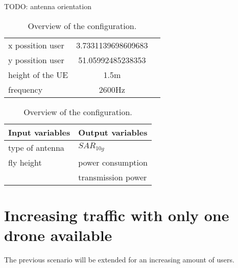 TODO: antenna orientation

\begin{table}[!htb]
    \begin{minipage}{.5\linewidth}
      \centering
        \begin{tabular}{|l|c|l|}
        \hline
        x possition user               & 3.7331139698609683        \\    
        y possition user               & 51.05992485238353           \\ 
        height of the \gls{UE}         & 1.5m                      \\ 
        frequency                      & 2600Hz                   \\ 
        \hline
        \end{tabular}
    \end{minipage}%
    \begin{minipage}{.5\linewidth}
      \centering
            \begin{tabular}{|l|l|}
            \hline
            Input variables                & Output variables          \\   \hline 
            type of antenna                & $SAR_{10g}$               \\ 
            fly height                     & power consumption             \\ 
                                           & transmission power            \\ 
            \hline
            \end{tabular}
    \end{minipage} 
        \caption{Overview of the configuration.}
        \label{table:confOverviewScenario1}
\end{table}




\section{Increasing traffic with only one drone available}
The previous scenario will be extended for an increasing amount of users. 

